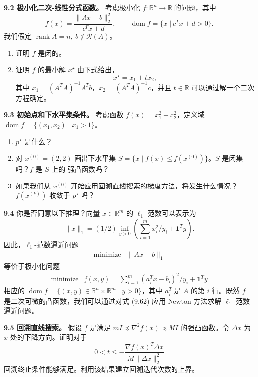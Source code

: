 \documentclass[UTF8,12pt,a4paper,fontset=fandol]{ctexart}
\begin{document}
\noindent\textbf{9.2 极小化二次-线性分式函数。}\quad
考虑极小化 $f:\mathbb{R}^n\to\mathbb{R}$ 的问题，其中
\[
f(x)=\frac{\|Ax-b\|_2^2}{c^Tx+d},\qquad
\operatorname{dom} f=\{x\mid c^Tx+d>0\}.
\]
我们假定 $\operatorname{rank} A=n,\ b\notin\mathcal{R}(A)$。
\begin{enumerate}
\item[(a)] 证明 $f$ 是闭的。
\item[(b)] 证明 $f$ 的最小解 $x^\star$ 由下式给出，
\[
x^\star=x_1+tx_2,
\]
其中 $x_1=(A^TA)^{-1}A^Tb$，$x_2=(A^TA)^{-1}c$，并且 $t\in\mathbb{R}$ 可以通过解一个二次方程确定。
\end{enumerate}

\noindent\textbf{9.3 初始点和下水平集条件。}\quad
考虑函数 $f(x)=x_1^2+x_2^2$，定义域 $\operatorname{dom} f=\{(x_1,x_2)\mid x_1>1\}$。
\begin{enumerate}
\item[(a)] $p^\star$ 是什么？
\item[(b)] 对 $x^{(0)}=(2,2)$ 画出下水平集 $S=\{x\mid f(x)\leq f(x^{(0)})\}$。$S$ 是闭集吗？$f$ 是 $S$ 上的
强凸函数吗？
\item[(c)] 如果我们从 $x^{(0)}$ 开始应用回溯直线搜索的梯度方法，将发生什么情况？$f(x^{(k)})$ 收敛于 $p^\star$ 吗？
\end{enumerate}

\noindent\textbf{9.4}\quad
你是否同意以下推理？向量 $x\in\mathbb{R}^m$ 的 $\ell_1$-范数可以表示为
\[
\|x\|_1=(1/2)\inf_{y>0}\left(\sum_{i=1}^m x_i^2/y_i+\mathbf{1}^Ty\right).
\]
因此，$\ell_1$-范数逼近问题
\[
\begin{array}{ll}
\mbox{minimize} & \|Ax-b\|_1
\end{array}
\]
等价于极小化问题
\begin{equation}
\begin{array}{ll}
\mbox{minimize} & f(x,y)=\sum_{i=1}^m(a_i^Tx-b_i)^2/y_i+\mathbf{1}^Ty
\end{array}
\tag{9.62}
\end{equation}
相应的 $\operatorname{dom} f=\{(x,y)\in\mathbb{R}^n\times\mathbb{R}^m\mid y>0\}$，其中 $a_i^T$ 是 $A$ 的第 $i$ 行。既然 $f$ 是二次可微的凸函数，我们可以通过对式 (9.62) 应用 Newton 方法求解 $\ell_1$-范数逼近问题。

\noindent\textbf{9.5 回溯直线搜索。}\quad
假设 $f$ 是满足 $mI\preceq\nabla^2 f(x)\preceq MI$ 的强凸函数。令 $\Delta x$ 为 $x$ 处的下降方向。证明对于
\[
0<t\leq -\frac{\nabla f(x)^T\Delta x}{M\|\Delta x\|_2^2}
\]
回溯终止条件能够满足。利用该结果建立回溯迭代次数的上界。
\end{document}
